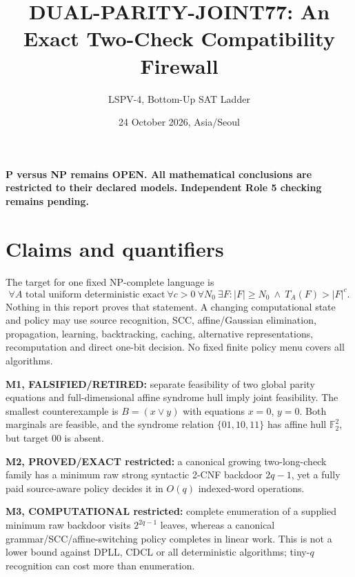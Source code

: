 \documentclass[11pt]{article}
\title{DUAL-PARITY-JOINT77: An Exact Two-Check Compatibility Firewall}
\author{LSPV-4, Bottom-Up SAT Ladder}
\date{24 October 2026, Asia/Seoul}
\begin{document}
\maketitle
\begin{center}\textbf{P versus NP remains OPEN. All mathematical conclusions are restricted to their declared models. Independent Role 5 checking remains pending.}\end{center}
\section{Claims and quantifiers}
The target for one fixed NP-complete language is
\[
\forall A\text{ total uniform deterministic exact}\ \forall c>0\ \forall N_0\ \exists F:
|F|\ge N_0\ \wedge\ T_A(F)>|F|^c.
\]
Nothing in this report proves that statement. A changing computational state and policy may use source recognition, SCC, affine/Gaussian elimination, propagation, learning, backtracking, caching, alternative representations, recomputation and direct one-bit decision. No fixed finite policy menu covers all algorithms.

\noindent\textbf{M1, FALSIFIED/RETIRED:} separate feasibility of two global parity equations and full-dimensional affine syndrome hull imply joint feasibility. The smallest counterexample is $B=(x\vee y)$ with equations $x=0$, $y=0$. Both marginals are feasible, and the syndrome relation $\{01,10,11\}$ has affine hull $\mathbb F_2^2$, but target $00$ is absent.

\noindent\textbf{M2, PROVED/EXACT restricted:} a canonical growing two-long-check family has a minimum raw strong syntactic 2-CNF backdoor $2q-1$, yet a fully paid source-aware policy decides it in $O(q)$ indexed-word operations.

\noindent\textbf{M3, COMPUTATIONAL restricted:} complete enumeration of a supplied minimum raw backdoor visits $2^{2q-1}$ leaves, whereas a canonical grammar/SCC/affine-switching policy completes in linear work. This is not a lower bound against DPLL, CDCL or all deterministic algorithms; tiny-$q$ recognition can cost more than enumeration.
\end{document}
